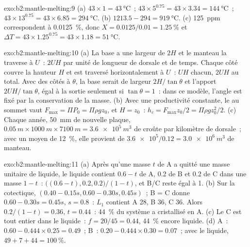 \begin{solution}{exo:b2:mantle-melting:9}
(a) $43\times1 = \qty{43}{\celsius}$~; $43\times5^{0.75} = 43\times3.34 =
\qty{144}{\celsius}$~; $43\times13^{0.75} = 43\times6.85 = \qty{294}{\celsius}$.
(b) $1213.5 - 294 = \qty{919}{\celsius}$. (c) \qty{125}{ppm} correspondent à
\qty{0.0125}{\percent}, donc $X = 0.0125/0.01 = \qty{1.25}{\percent}$ et $\Delta T =
43\times1.25^{0.75} = 43\times1.18 = \qty{51}{\celsius}$.
\end{solution}

\begin{solution}{exo:b2:mantle-melting:10}
(a) La base a une largeur de $2H$ et le manteau la traverse à $U$~: $2UH$ par unité de
longueur de dorsale et de temps. Chaque côté couvre la hauteur $H$ et est traversé horizontalement à
$U$~: $UH$ chacun, $2UH$ au total. Avec des côtés à $\theta$, la base serait de
largeur $2H/\tan\theta$ et l'apport $2UH/\tan\theta$, égal à la sortie seulement si
$\tan\theta = 1$~: dans ce modèle, l'angle est fixé par la conservation de la masse. (b) Avec une
productivité constante, le  au sommet vaut $F_{\max} = \Pi P_0 = \Pi\rho
g z_0$, et $H = z_0$~: $h_c = F_{\max}z_0/2 = \Pi\rho g z_0^2/2$. (c) Chaque année,
\qty{50}{mm} de nouvelle plaque, $\qty{0.05}{m}\times\qty{1000}{m}\times\qty{7100}{m} =
\qty{3.6e5}{m^3}$ de croûte par kilomètre de dorsale~; avec un  moyen de
\qty{12}{\percent}, elle provient de $\num{3.6e5}/0.12 = \qty{3.0e6}{m^3}$ de manteau.
\end{solution}

\begin{solution}{exo:b2:mantle-melting:11}
(a) Après qu'une masse $t$ de A a quitté une masse unitaire de liquide, le liquide contient $0.6 -
t$ de A, 0.2 de B et 0.2 de C dans une masse $1 - t$~: $\big((0.6 - t), 0.2,
0.2\big)/(1 - t)$, et B/C reste égal à 1. (b) Sur la cotectique, $(0.40 - 0.15s, 0.60 -
0.30s, 0.45s)$~; B = C donne $0.60 - 0.30s = 0.45s$, $s = 0.8$~: $L_1$ contient A 28, B
36, C 36. Alors $0.2/(1 - t) = 0.36$, $t = 0.44$~: \qty{44}{\percent} du système a
cristallisé en A. (c) Le C est tout entier dans le liquide~: $f = 20/45 = 0.44$,
\qty{44}{\percent} encore liquide. (d) A~: $0.60 - 0.444\times0.25 = 0.49$~; B~: $0.20 -
0.444\times0.30 = 0.07$~; avec le liquide, $49 + 7 + 44 = \qty{100}{\percent}$.
\end{solution}

